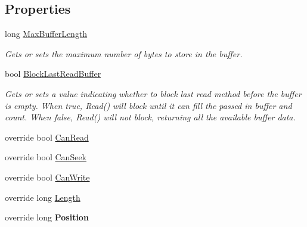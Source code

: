 \subsection*{Properties}
\begin{DoxyCompactItemize}
\item 
long \mbox{\hyperlink{class_a_d_l_1_1_pipe_stream_a250f42c7da667f60487068e27c3d67d0}{Max\+Buffer\+Length}}
\begin{DoxyCompactList}\small\item\em Gets or sets the maximum number of bytes to store in the buffer. \end{DoxyCompactList}\item 
bool \mbox{\hyperlink{class_a_d_l_1_1_pipe_stream_af05e530e849bfee481290e8139f27379}{Block\+Last\+Read\+Buffer}}
\begin{DoxyCompactList}\small\item\em Gets or sets a value indicating whether to block last read method before the buffer is empty. When true, Read() will block until it can fill the passed in buffer and count. When false, Read() will not block, returning all the available buffer data. \end{DoxyCompactList}\item 
override bool \mbox{\hyperlink{class_a_d_l_1_1_pipe_stream_a194eae1c5b19a0999a5d12bcef00efd9}{Can\+Read}}
\item 
override bool \mbox{\hyperlink{class_a_d_l_1_1_pipe_stream_ad891fa332a41aeb44026c5a89ddc36e8}{Can\+Seek}}
\item 
override bool \mbox{\hyperlink{class_a_d_l_1_1_pipe_stream_a24b173b85db2cb2c76c8688086e6aebb}{Can\+Write}}
\item 
override long \mbox{\hyperlink{class_a_d_l_1_1_pipe_stream_a4c9f83e98008f203c5535ad730ca0614}{Length}}
\item 
\mbox{\label{class_a_d_l_1_1_pipe_stream_ae0cdcae01baf4b9cab2e947e1e38e284}} 
override long {\bfseries Position}
\end{DoxyCompactItemize}


